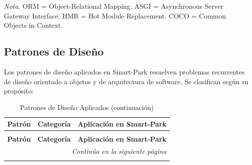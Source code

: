 \textit{Nota.} ORM = Object-Relational Mapping. ASGI = Asynchronous Server Gateway Interface. HMR = Hot Module Replacement. COCO = Common Objects in Context.

\subsection{Patrones de Diseño}

Los patrones de diseño aplicados en Smart-Park resuelven problemas recurrentes de diseño orientado a objetos y de arquitectura de software. Se clasifican según su propósito:

\begin{longtable}{p{2.5cm} p{2.5cm} p{9cm}}
\caption{Patrones de Diseño Aplicados} \\
\toprule
\textbf{Patrón} & \textbf{Categoría} & \textbf{Aplicación en Smart-Park} \\
\midrule
\endfirsthead

\caption[]{Patrones de Diseño Aplicados (continuación)} \\
\toprule
\textbf{Patrón} & \textbf{Categoría} & \textbf{Aplicación en Smart-Park} \\
\midrule
\endhead

\midrule
\multicolumn{3}{r}{\footnotesize\textit{Continúa en la siguiente página}} \\
\endfoot

\bottomrule
\endlastfoot


\end{longtable}
